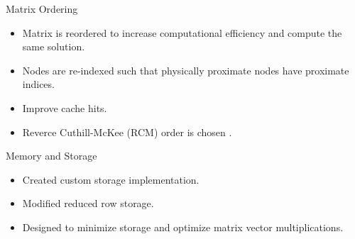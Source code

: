 \begin{frame}{Matrix Ordering}
  \begin{itemize}
    \item Matrix is reordered to increase computational efficiency and compute
      the same solution.
    \item Nodes are re-indexed such that physically proximate nodes have
      proximate indices.
    \item Improve cache hits.
    \item Reverce Cuthill-McKee (RCM) order is chosen \cite{rcm}.
  \end{itemize}
  \vspace{-0.25in}
  \begin{figure}
    \centering
    \hspace{0.1in}
    \label{fig:sparsity_pattern}
  \end{figure}
\end{frame}

\begin{frame}{Memory and Storage}
  \begin{itemize}
    \item Created custom \twotable storage implementation.
    \item Modified reduced row storage.
    \item Designed to minimize storage and optimize matrix vector
      multiplications.
  \end{itemize}
\end{frame}

